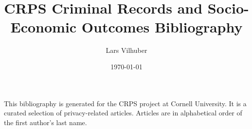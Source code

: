 \documentclass[12pt,letterpaper]{article}
\author{Lars Vilhuber}
\date{\today}
\title{CRPS Criminal Records and Socio-Economic Outcomes Bibliography}
\begin{document}
\maketitle
\nocite{*}
This bibliography is generated for the CRPS project at Cornell University. It is a curated selection of privacy-related articles. Articles are in alphabetical order of the first author's last name.


\printbibliography[title={Articles}]
\end{document}
